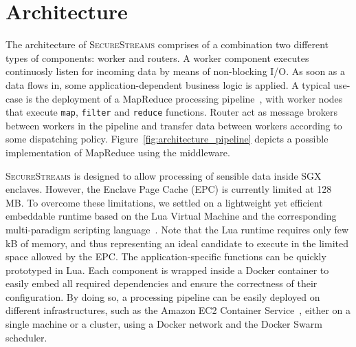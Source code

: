 \section{Architecture}
\label{sec:architecture}


The architecture of \textsc{SecureStreams} comprises of a combination two different types of components: worker and routers.
A worker component executes continuosly listen for incoming data by means of non-blocking I/O.
As soon as a data flows in, some application-dependent business logic is applied.
A typical use-case is the deployment of a MapReduce processing pipeline~\cite{Dean:2008:MSD:1327452.1327492}, with worker nodes that execute \texttt{map}, \texttt{filter} and \texttt{reduce} functions.
Router act as message brokers between workers in the pipeline and transfer data between workers according to some dispatching policy.
Figure~\ref{fig:architecture_pipeline} depicts a possible implementation of MapReduce using the \SYS middleware.

\textsc{SecureStreams} is designed to allow processing of sensible data inside SGX enclaves.
However, the Enclave Page Cache (EPC) is currently limited at 128 MB.
To overcome these limitations, we settled on a lightweight yet efficient embeddable runtime based on the Lua Virtual Machine\cite{ierusalimschy_luaextensible_1996} and the corresponding multi-paradigm scripting language~\cite{lualang}.
Note that the Lua runtime requires only few kB of memory, and thus representing an ideal candidate to execute in the limited space allowed by the EPC.
The application-specific functions can be quickly prototyped in Lua. 
Each component is wrapped inside a Docker container to easily embed all required dependencies and ensure the correctness of their configuration.
By doing so, a processing pipeline can be easily deployed on different infrastructures, such as the Amazon EC2 Container Service~\cite{awsec2container}, either on a single machine or a cluster, using a Docker network and the Docker Swarm\cite{docker:swarm_2016} scheduler.


